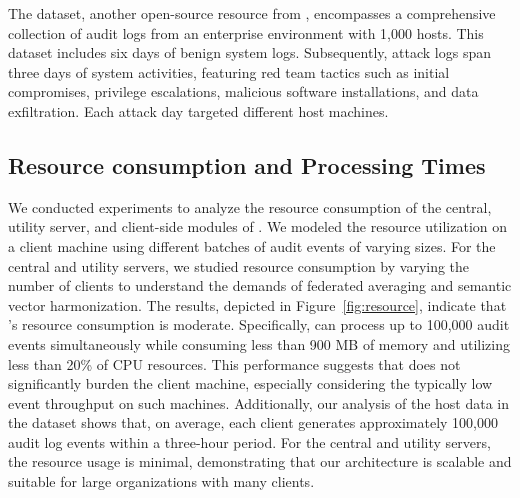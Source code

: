 The \optc dataset, another open-source resource from \darpa, encompasses a comprehensive collection of audit logs from an enterprise environment with 1,000 hosts. This dataset includes six days of benign system logs. Subsequently, attack logs span three days of system activities, featuring red team tactics such as initial compromises, privilege escalations, malicious software installations, and data exfiltration. Each attack day targeted different host machines.

\subsection*{Resource consumption and Processing Times}
\label{sec:resource_consumption}

 We conducted experiments to analyze the resource consumption of the central, utility server, and client-side modules of \Sys. We modeled the resource utilization on a client machine using different batches of audit events of varying sizes. For the central and utility servers, we studied resource consumption by varying the number of clients to understand the demands of federated averaging and semantic vector harmonization. The results, depicted in Figure~\ref{fig:resource}, indicate that \Sys's resource consumption is moderate. Specifically, \Sys can process up to 100,000 audit events simultaneously while consuming less than 900 MB of memory and utilizing less than 20\% of CPU resources. This performance suggests that \Sys does not significantly burden the client machine, especially considering the typically low event throughput on such machines. Additionally, our analysis of the host data in the \optc dataset shows that, on average, each client generates approximately 100,000 audit log events within a three-hour period. For the central and utility servers, the resource usage is minimal, demonstrating that our architecture is scalable and suitable for large organizations with many clients.

